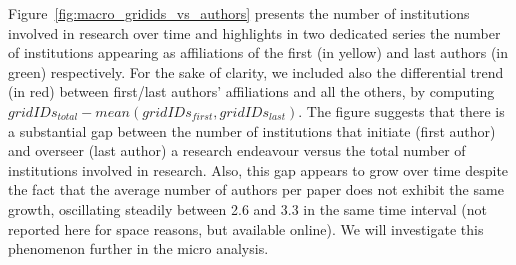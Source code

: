 \documentclass{llncs}
\begin{document}
Figure~\ref{fig:macro_gridids_vs_authors} presents the number of institutions involved in research over time and highlights in two dedicated series the number of institutions appearing as affiliations of the first (in yellow) and last authors (in green) respectively. 
For the sake of clarity, we included also the differential trend (in red) between first/last authors' affiliations and all the others, by computing $gridIDs_{total} - mean(gridIDs_{first}, gridIDs_{last})$.
The figure suggests that there is a substantial gap between the number of institutions that initiate (first author) and overseer (last author) a research endeavour versus the total number of institutions involved in research.
Also, this gap appears to grow over time despite the fact that the average number of authors per paper does not exhibit the same growth, oscillating steadily between 2.6 and 3.3 in the same time interval (not reported here for space reasons, but available online). We will investigate this phenomenon further in the micro analysis.
%
\end{document}
